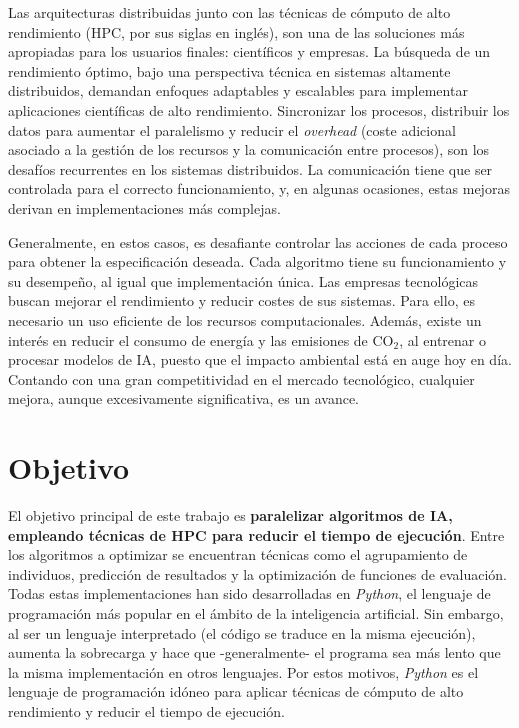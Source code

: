 	Las arquitecturas distribuidas junto con las técnicas de cómputo de alto rendimiento (HPC, por sus siglas en inglés), son una de las soluciones más apropiadas para los usuarios finales: científicos y empresas. La búsqueda de un rendimiento óptimo, bajo una perspectiva técnica en sistemas altamente distribuidos, demandan enfoques adaptables y escalables para implementar aplicaciones científicas de alto rendimiento. Sincronizar los procesos, distribuir los datos para aumentar el paralelismo y reducir el \textit{overhead} (coste adicional asociado a la gestión de los recursos y la comunicación entre procesos), son los desafíos recurrentes en los sistemas distribuidos. La comunicación tiene que ser controlada para el correcto funcionamiento, y, en algunas ocasiones, estas mejoras derivan en implementaciones más complejas.
	
	Generalmente, en estos casos, es desafiante controlar las acciones de cada proceso para obtener la especificación deseada. Cada algoritmo tiene su funcionamiento y su desempeño, al igual que implementación única. Las empresas tecnológicas buscan mejorar el rendimiento y reducir costes de sus sistemas. Para ello, es necesario un uso eficiente de los recursos computacionales. Además, existe un interés en reducir el consumo de energía y las emisiones de CO\(_2\), al entrenar o procesar modelos de IA, puesto que el impacto ambiental está en auge hoy en día. Contando con una gran competitividad en el mercado tecnológico, cualquier mejora, aunque excesivamente significativa, es un avance.


\section{Objetivo}

	El objetivo principal de este trabajo es \textbf{paralelizar algoritmos de IA, empleando técnicas de HPC para reducir el tiempo de ejecución}. Entre los algoritmos a optimizar se encuentran técnicas como el agrupamiento de individuos, predicción de resultados y la optimización de funciones de evaluación. Todas estas implementaciones han sido desarrolladas en \textit{Python}, el lenguaje de programación más popular en el ámbito de la inteligencia artificial\cite{sainin2021best}. Sin embargo, al ser un lenguaje interpretado (el código se traduce en la misma ejecución), aumenta la sobrecarga y hace que -generalmente- el programa sea más lento que la misma implementación en otros lenguajes. Por estos motivos, \textit{Python} es el lenguaje de programación idóneo para aplicar técnicas de cómputo de alto rendimiento y reducir el tiempo de ejecución.
	
